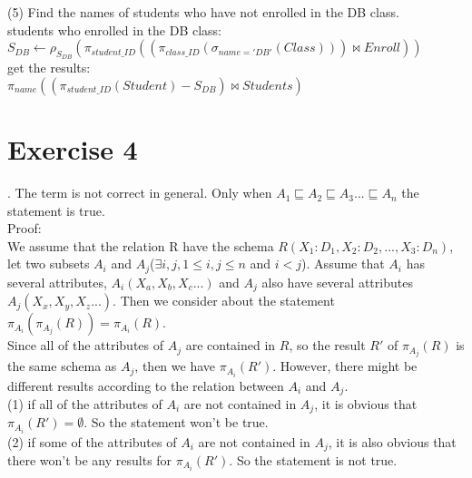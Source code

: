 \documentclass[]{article}
\begin{document}
	\noindent(5) Find the names of students who have not enrolled in the DB class.\\

	students who enrolled in the DB class:\\
	
	$S_{DB}\leftarrow \rho_{S_{DB}}(\pi_{student\_ID}((\pi_{class\_ID}(\sigma_{name='DB'}(Class)))\bowtie Enroll))$\\
	
	get the results:\\
	
	$\pi_{name}((\pi_{student\_ID}(Student)-S_{DB})\bowtie Students)$\\
	
	\clearpage
	\section{Exercise 4}
	
	. The term is not correct in general. Only when $A_{1}\sqsubseteq A_{2}\sqsubseteq A_{3}...\sqsubseteq A_{n}$ the statement is true.\\
	
	\noindent Proof: \\
	
	\noindent We assume that the relation R have the schema $R(X_{1}:D_{1},X_{2}:D_{2},...,X_{3}:D_{n})$, let two subsets $A_{i}$ and $A_{j}$($\exists i,j, 1\le i,j\le n $ and $i<j$). Assume that $A_{i}$ has several attributes, $A_{i}(X_{a}, X_{b}, X_{c}...)$ and $A_{j}$ also have several attributes $A_{j}(X_{x}, X_{y}, X_{z}...)$. Then we consider about the statement $\pi_{A_{i}}(\pi_{A_{j}}(R)) = \pi_{A_{i}}(R)$.\\
	
	\noindent Since all of the attributes of $A_{j}$ are contained in $R$, so the result $R'$ of $\pi_{A_{j}}(R)$ is the same schema as $A_{j}$, then we have $\pi_{A_{i}}(R')$. However, there might be different results according to the relation between $A_{i}$ and $A_{j}$.\\
	
	(1) if all of the attributes of $A_{i}$ are not contained in $A_{j}$, it is obvious that $\pi_{A_{i}}(R') = \emptyset$. So the statement won't be true.\\
	
	(2) if some of the attributes of $A_{i}$ are not contained in $A_{j}$, it is also obvious that there won't be any results for $\pi_{A_{i}}(R')$. So the statement is not true.\\
	
\end{document}
